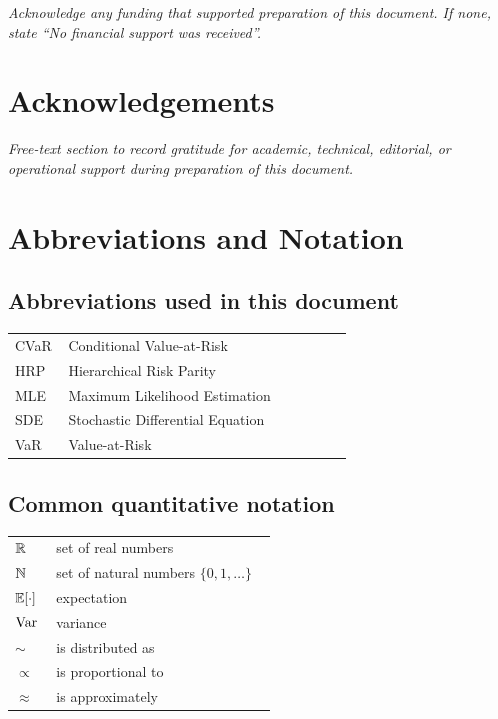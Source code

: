 \noindent
\textit{Acknowledge any funding that supported preparation of this
document. If none, state ``No financial support was received''.}

\section*{Acknowledgements}

\noindent
\textit{Free-text section to record gratitude for academic, technical,
editorial, or operational support during preparation of this document.}

\section*{Abbreviations and Notation}

\subsection*{Abbreviations used in this document}
\noindent
\begin{longtable}{p{0.15\linewidth} p{0.80\linewidth}}
  CVaR  & Conditional Value-at-Risk                 \\
  HRP   & Hierarchical Risk Parity                  \\
  MLE   & Maximum Likelihood Estimation             \\
  SDE   & Stochastic Differential Equation          \\
  VaR   & Value-at-Risk                             \\
\end{longtable}

\subsection*{Common quantitative notation}
\noindent
\begin{longtable}{p{0.15\linewidth} p{0.80\linewidth}}
  $\mathbb{R}$            & set of real numbers                                  \\
  $\mathbb{N}$            & set of natural numbers $\{0, 1, \dots\}$             \\
  $\mathbb{E}[\cdot]$     & expectation                                          \\
  $\operatorname{Var}$          & variance                                             \\
  $\sim$          & is distributed as                                    \\
  $\propto$       & is proportional to                                   \\
  $\approx$       & is approximately                                     \\
\end{longtable}
